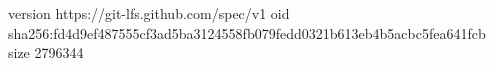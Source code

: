 version https://git-lfs.github.com/spec/v1
oid sha256:fd4d9ef487555cf3ad5ba3124558fb079fedd0321b613eb4b5acbc5fea641fcb
size 2796344

